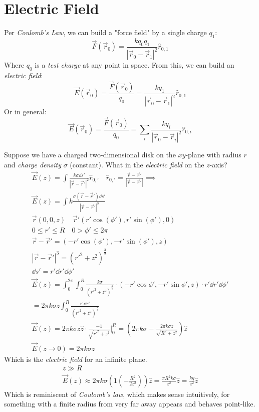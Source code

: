 \documentclass[00_complete]{subfiles}
\begin{document}
\section{Electric Field}
Per \emph{Coulomb's Law}, we can build a "force field" by a single charge $q_1$:
$$\vec F(\vec r_0)= \frac{kq_0q_1}{|\vec r_0-\vec r_1|^2}\hat r_{0,1}$$
Where $q_0$ is a \emph{test charge} at any point in space.
From this, we can build an \emph{electric field}:
$$\vec E(\vec r_0) =\frac{\vec F(\vec r_0)}{q_0}= \frac{kq_1}{|\vec r_0-\vec r_1|^2}\hat r_{0,1}$$
Or in general:
$$\vec E(\vec r_0) =\frac{\vec F(\vec r_0)}{q_0}= \sum_i\frac{kq_i}{|\vec r_0-\vec
r_i|^2}\hat r_{0,i}$$
\begin{example}
    Suppose we have a charged two-dimensional disk on the $xy$-plane with
    radius $r$ and \emph{charge density} $\sigma$ (constant). What in the
    \emph{electric field} on the $z$-axis?
    \begin{gather*}
        \vec E(z)=\int\frac{k\sigma \dd{s'}}{|\vec r - \vec r'|^2}\hat r_{0,'}
        \quad \hat r_{0,'} = \frac{\vec r -\vec r'}{|\vec r - \vec r'|} \implies \\
        \vec E(z)=\int k\frac{\sigma(\vec r- \vec r')\dd{s'}}{|\vec r -\vec r'|^3}
        \\
        \vec r (0,0,z) \quad \vec r' (r'\cos(\phi'),r'\sin(\phi'),0) \\
        0 \leq  r' \leq R \quad 0 > \phi' \leq 2 \pi \\
        \vec r -\vec r' = (-r'\cos(\phi'),-r'\sin(\phi'),z) \\
        |\vec r- \vec r'|^3=(r'^2+z^2)^\frac{3}{2} \\
        \dd{s'}=r'\dd{r'}\dd{\phi'} \\
        \vec E(z)=\int_0^{2\pi}\int_{0}^{R} \frac{k\sigma}
        {(r'^2+z^2)^\frac{3}{2}}\cdot(-r'\cos{\phi'},-r'\sin{\phi'},z)\cdot
        r' \dd{r'}\dd{\phi'} \\
        =2 \pi k \sigma z \int_{0}^{R}\frac{r' \dd{r'}}{(r'^2+z^2)^\frac{3}{2}}
        \\
        \vec E(z)=2 \pi k \sigma z \hat z \cdot
        \frac{-1}{\sqrt{r'^2+z^2}}\biggr|_0^R = \left(2\pi k\sigma -
        \frac{2\pi k \sigma z}{\sqrt{R^2+z^2}}\right)\hat z \\
        \boxed{\vec E (z \to 0)=2\pi k \sigma \hat z}
    \end{gather*}
    Which is the \emph{electric field} for an infinite plane.
    \begin{gather*}
        z\gg R \\
        \vec E(z) \approx 2 \pi k \sigma \left( 1
        \left(-\frac{R^2}{2z^2}\right)\right)\hat z = \frac{\pi
        R^2k\sigma}{z^2}\hat z = \frac{kq}{z^2}\hat z
    \end{gather*}
    Which is reminiscent of \emph{Coulomb's law}, which makes sense
    intuitively, for something with a finite radius from very far away appears
    and behaves point-like.
\end{example}
\end{document}
